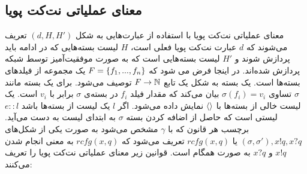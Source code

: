 \subsection{معنای عملیاتی نت‌کت پویا}
معنای عملیاتی
نت‌کت پویا با استفاده از عبارت‌هایی به شکل
$(d,H,H')$
تعریف می‌شوند که
$d$
عبارت نت‌کت‌ پویا فعلی است،
$H$
لیست بسته‌هایی که در ادامه باید پردازش شوند
و
$H'$
لیست بسته‌هایی است که به صورت موفقیت‌آمیز توسط شبکه پردازش شده‌اند.
در اینجا فرض می شود که
$F = \{f_1,...,f_n\}$
یک مجموعه از فیلد‌های بسته‌ها است.
یک بسته به شکل یک تابع
$F \rightarrow \mathbb{N}$
توصیف می‌شود.
برای یک بسته مانند
$\sigma$
تساوی
$\sigma(f_i) = v_i$
بیان می‌کند که مقدار فیلد
$f_i$
در بسته‌ی
$\sigma$
برابر با
$v_i$
است.
یک لیست خالی از بسته‌ها با
$\langle  \rangle$
نمایش داده می‌شود.
اگر
$l$
یک لیست از بسته‌ها باشد
$e::l$
لیستی است که حاصل از اضافه کردن بسته
$\sigma$
به ابتدای لیست به دست می‌آید.
برچسب هر قانون که با
$\gamma$
مشخص می‌شود به صورت یکی از شکل‌های
$(\sigma,\sigma'),x!q,x?q$
یا
$rcfg(x,q)$
تعریف می‌شود
که
$rcfg(x,q)$
به معنی انجام شدن
$x!q$
و
$x?q$
به صورت همگام
است.
قوانین زیر معنای عملیاتی نت‌کت پویا را تعریف می‌کنند:
